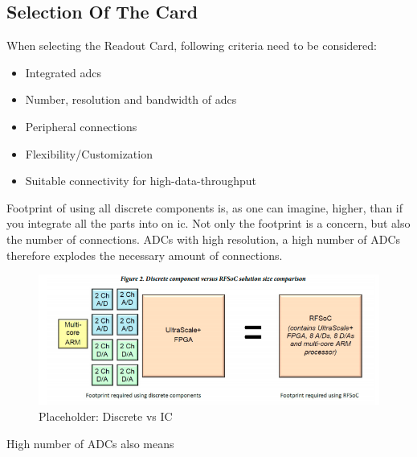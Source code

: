 \subsection{Selection Of The Card}\label{sec:selection}
When selecting the Readout Card, following criteria need to be considered:
\begin{itemize}
	\item Integrated \glspl{adc}
	\item Number, resolution and bandwidth of \glspl{adc}
	\item Peripheral connections
	\item Flexibility/Customization
	\item Suitable connectivity for high-data-throughput
\end{itemize}

Footprint of using all discrete components is, as one can imagine, higher, than if you integrate all the parts into on \gls{ic}. Not only the footprint is a concern, but also the number of connections. ADCs with high resolution, a high number of ADCs therefore explodes the necessary amount of connections. 
\begin{figure}[tbh]
	\centering
	\includegraphics[width = \textwidth]{chap/04-work/img/footprint}
	\caption{Placeholder: Discrete vs IC}
	\label{fig:footprint}
\end{figure}
High number of ADCs also means 

